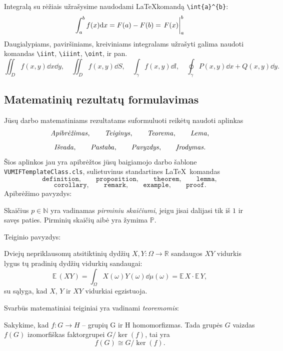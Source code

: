 \documentclass[]{VUMIFTemplateClass}
\newcommand{\EE}{\mathbb{E}\,} %
\begin{document}
Integralą su rėžiais užrašysime naudodami \LaTeX komandą \texttt{\textbackslash int\textunderscore \{a\}\^{}\{b\}}:
\[
\int_{a}^{b}f(x) \dd x = F(a) - F(b) = \eval{F(x)}_{a}^{b}
\]
Daugialypiams, paviršiniams, kreiviniams integralams užrašyti galima naudoti komandas \texttt{\textbackslash iint}, \texttt{\textbackslash iiint}, \texttt{\textbackslash oint}, ir pan.
\[
\iint_{D}f(x, y)\dd{x}\dd{y},\quad
\iint_{D} f(x,y)\dd{S}, \quad
\int_{\gamma} f(x,y)\dd{l},\quad
\oint_{\gamma} P(x,y)\dd{x}+Q(x,y)\dd{y}.
\]

\subsection{Matematinių rezultatų formulavimas}

Jūsų darbo matematiniams rezultatams suformuluoti reikėtų naudoti aplinkas
\[
\text{\emph{Apibrėžimas}},\qquad \text{\emph{Teiginys}}, \qquad \text{\emph{Teorema}}, \qquad \text{\emph{Lema}},
\]
\[
\text{\emph{Išvada}}, \qquad \text{\emph{Pastaba}}, \qquad  \text{\emph{Pavyzdys}}, \qquad \text{\emph{Įrodymas}}.
\]
Šios aplinkos jau yra apibrėžtos
jūsų baigiamojo darbo šablone \texttt{VUMIFTemplateClass.cls}, sulietuvinus standartines \LaTeX\  komandas
\[
\texttt{definition}, \qquad \texttt{proposition}, \qquad \texttt{theorem}, \qquad \texttt{lemma},
\]
\[
\texttt{corollary}, \qquad \texttt{remark}, \qquad \texttt{example}, \qquad \texttt{proof}.
\]
\noindent Apibrėžimo pavyzdys:
\begin{definition}
Skaičius $p \in \mathbb{N}$ yra vadinamas \emph{pirminiu skaičiumi}, jeigu jisai dalijasi tik iš $1$ ir savęs paties. Pirminių skaičių aibė yra žymima $\mathbb{P}$.
\end{definition}
\noindent Teiginio pavyzdys:
\begin{proposition}
Dviejų nepriklausomų atsitiktinių dydžių $X, Y: \Omega \to \mathbb{R}$ sandaugos $XY$ vidurkis lygus tų pradinių dydžių vidurkių sandaugai:
\[
\EE{(XY)}=\int_{\Omega} X(\omega)Y(\omega)\dd\mu(\omega) = \EE{X} \cdot \EE{Y},
\]
su sąlyga, kad $X$, $Y$ ir $XY$ vidurkiai egzistuoja.
\end{proposition}

\noindent  Svarbūs matematiniai teiginiai yra vadinami \emph{teoremomis}:
\begin{theorem}\label{teor1}
    Sakykime, kad $f: G {\rightarrow} H$ – grupių G ir H homomorfizmas. Tada grupės $G$ vaizdas $f(G)$ izomorfiškas faktorgrupei $G / \ker{(f)}$, tai yra
    \[
        f(G) \cong G \big / \ker{(f)}.
    \]
\end{theorem}
\end{document}
